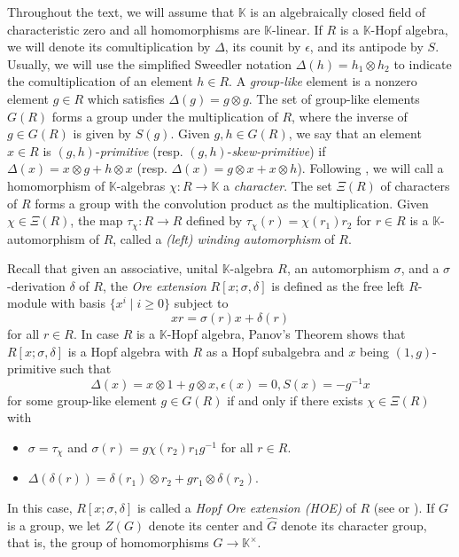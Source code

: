 \documentclass[11pt, twoside]{amsart}
\theoremstyle{definition}
\newcommand{\KK}{\mathbb{K}}
\begin{document}
Throughout the text, we will assume that $\KK$ is an algebraically closed field of characteristic zero and all homomorphisms are $\KK$-linear. If $R$ is a $\KK$-Hopf algebra, we will denote its comultiplication by $\Delta$, its counit by $\epsilon$, and its antipode by $S$. Usually, we will use the simplified Sweedler notation $\Delta(h) = h_1 \otimes h_2$ to indicate the comultiplication of an element $h \in R$. A \emph{group-like} element is a nonzero element $g \in R$ which satisfies $\Delta(g) = g \otimes g$. The set of group-like elements $G(R)$ forms a group under the multiplication of $R$, where the inverse of $g \in G(R)$ is given by $S(g)$. Given $g, h \in G(R)$, we say that an element $x \in R$ is $(g,h)$-\emph{primitive} (resp. $(g,h)$-\emph{skew-primitive}) if $\Delta(x) = x \otimes g + h\otimes x$ (resp. $\Delta(x) = g \otimes x + x \otimes h$). Following \cite{Brown-O'Hagan-Zhang}, we will call a homomorphism of $\KK$-algebras $\chi:R \to \KK$ a \emph{character}. The set $\Xi(R)$ of characters of $R$ forms a group with the convolution product as the multiplication. Given $\chi \in \Xi(R)$, the map $\tau_\chi : R\to R$ defined by $\tau_\chi (r) = \chi(r_1)r_2$ for $r \in R$ is a $\KK$-automorphism of $R$, called a \emph{(left) winding automorphism} of $R$. 


Recall that given an associative, unital $\KK$-algebra $R$, an automorphism $\sigma$, and a $\sigma$-derivation $\delta$ of $R$, the \emph{Ore extension} $R[x; \sigma, \delta]$ is defined as the free left $R$-module with basis $\{x^i \mid i \geq 0\}$ subject to
%
\[xr = \sigma(r)x + \delta(r)\]
%
for all $r \in R$. In case $R$ is a $\KK$-Hopf algebra, Panov's Theorem \cite{Panov} shows that $R[x; \sigma, \delta]$ is a Hopf algebra with $R$ as a Hopf subalgebra and $x$ being $(1,g)$-primitive such that 
%
\[\Delta(x) = x\otimes 1 + g\otimes x, \epsilon(x) = 0, S(x) = -g^{-1}x\]
%
for some group-like element $g \in G(R)$ if and only if there exists $\chi \in \Xi(R)$ with
%
\begin{itemize}
    \item[(i)] $\sigma = \tau_\chi$ and $\sigma(r) = g\chi(r_2)r_1 g^{-1}$ for all $r \in R$.
    \item[(ii)] $\Delta(\delta(r)) = \delta(r_1) \otimes r_2 + gr_1 \otimes \delta(r_2)$.
\end{itemize}
%
In this case, $R[x;\sigma, \delta]$ is called a \emph{Hopf Ore extension (HOE)} of $R$ (see \cite{Panov} or \cite[Theorem 2.4]{Brown-O'Hagan-Zhang}). If $G$ is a group, we let $Z(G)$ denote its center and $\widehat{G}$ denote its character group, that is, the group of homomorphisms $G \to \KK^{\times}$. 
\end{document}
